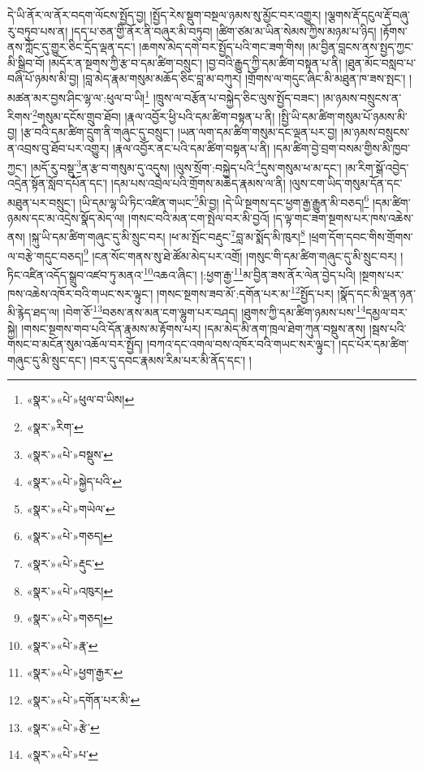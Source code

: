 དེ་ཡི་ནོར་ལ་ནོར་བདག་ལོངས་སྤྱོད་བྱ། །སྤྱོད་རེས་སྡུག་བསྔལ་ཉམས་སུ་མྱོང་བར་འགྱུར། །ལྕགས་རྡོ་དངུལ་རྡོ་བཞུ་རུ་བཏུབ་པས་ན། །དད་པ་ཅན་གྱི་ནོར་ནི་བཞུར་མི་བཏུབ། །ཚིག་ཙམ་མ་ཡིན་སེམས་ཀྱིས་མཉམ་པ་ཉིད། །རྟོགས་ནས་ཀློང་དུ་གྱུར་ཅིང་དྲོད་ལྡན་དང་། །ཆགས་མེད་དགེ་བར་སྤྱོད་པའི་གང་ཟག་གིས། །མ་བྱིན་བླངས་ནས་སྤྱད་ཀྱང་མི་སྒྲིབ་བོ། །མདོར་ན་སྔགས་ཀྱི་རྩ་བ་དམ་ཚིག་བསྲུང་། །བྱ་བའི་རྒྱུད་ཀྱི་དམ་ཚིག་བསྟན་པ་ནི། །ཐུན་མོང་བསླབ་པ་བཞི་པོ་ཉམས་མི་བྱ། །བླ་མེད་རྣམ་གསུམ་མཆོད་ཅིང་བླ་མ་བཀུར། །གྲོགས་ལ་གདུང་ཞིང་མི་མཐུན་ཁ་ཟས་སྤང་། །མཚན་མར་བྱས་ཤིང་ལྷ་ལ་:ཕུལ་བ་ཡི།\footnote{«སྣར་»«པེ་»ཕུལ་བ་ཡིས།} །ཁྲུས་ལ་བརྩོན་པ་བསྐྱེད་ཅིང་ལུས་སྤྱོད་བཟང་། །མ་ཉམས་བསྲུངས་ན་རིགས་\footnote{«སྣར་»རིག་}གསུམ་དངོས་གྲུབ་ཐོབ། །རྣལ་འབྱོར་ཕྱི་པའི་དམ་ཚིག་བསྟན་པ་ནི། །སྤྱི་ཡི་དམ་ཚིག་གསུམ་པོ་ཉམས་མི་བྱ། །རྩ་བའི་དམ་ཚིག་དྲུག་ནི་གཞུང་དུ་བསྲུང་། །ཡན་ལག་དམ་ཚིག་གསུམ་དང་ལྡན་པར་བྱ། །མ་ཉམས་བསྲུངས་ན་འབྲས་བུ་ཐོབ་པར་འགྱུར། །རྣལ་འབྱོར་ནང་པའི་དམ་ཚིག་བསྟན་པ་ནི། །དམ་ཚིག་བྱེ་བྲག་བསམ་གྱིས་མི་ཁྱབ་ཀྱང་། །མདོ་རུ་བསྡུ་\footnote{«སྣར་»«པེ་»བསྡུས་}ན་རྩ་བ་གསུམ་དུ་འདུས། །ལུས་སྲོག་:བསྐྱེད་པའི་\footnote{«སྣར་»«པེ་»སྐྱེད་པའི་}དུས་གསུམ་ཕ་མ་དང་། །མ་རིག་སྒོ་འབྱེད་འདྲེན་སྟོན་སློབ་དཔོན་དང་། །དམ་པས་འབྲེལ་པའི་གྲོགས་མཆེད་རྣམས་ལ་ནི། །ལུས་ངག་ཡིད་གསུམ་དོན་དང་མཐུན་པར་བསྲུང་། །ཡི་དམ་ལྷ་ཡི་ཏིང་འཛིན་གཡང་\footnote{«སྣར་»«པེ་»གཡེལ་}མི་བྱ། །དེ་ཡི་སྔགས་དང་ཕྱག་རྒྱ་རྒྱུན་མི་བཅད།\footnote{«སྣར་»«པེ་»གཅད།} །དམ་ཚིག་ཉམས་དང་མ་འདྲེས་སྣོད་མེད་ལ། །གསང་བའི་མན་ངག་སྤེལ་བར་མི་བྱའོ། །ད་ལྟ་གང་ཟག་སྔགས་པར་ཁས་འཆེས་ནས། །སྐུ་ཡི་དམ་ཚིག་གཞུང་དུ་མི་སྲུང་བར། །ཕ་མ་སྤོང་བརྡུང་\footnote{«སྣར་»«པེ་»རྡུང་}བླ་མ་སྨོད་མི་ཁུར།\footnote{«སྣར་»«པེ་»འཁུར།} །ཕྲག་དོག་དབང་གིས་གྲོགས་ལ་བརྩེ་གདུང་བཅད།\footnote{«སྣར་»«པེ་»གཅད།} །ངན་སོང་གནས་སུ་ཐེ་ཚོམ་མེད་པར་འགྲོ། །གསུང་གི་དམ་ཚིག་གཞུང་དུ་མི་སྲུང་བར། །ཏིང་འཛིན་འདོད་སྒྲུབ་འཛབ་ཏུ་མནའ་\footnote{«སྣར་»«པེ་»རྣ་}འཆའ་ཞིང་། །:ཕྱག་རྒྱ་\footnote{«སྣར་»«པེ་»ཕྱག་རྒྱར་}མ་བྱིན་ཟས་ནོར་ལེན་བྱེད་པའི། །སྔགས་པར་ཁས་འཆེས་འཁོར་བའི་གཡང་སར་ལྟུང་། །གསང་སྔགས་ཟབ་མོ་:དགོན་པར་མ་\footnote{«སྣར་»«པེ་»དགོན་པར་མི་}སྤྱོད་པར། །སྣོད་དང་མི་ལྡན་ཉན་མི་རྙེད་ཐད་ལ། །བེག་ཅོ་\footnote{«སྣར་»«པེ་»རྩེ་}བཅས་ནས་མན་ངག་ལྷུག་པར་བཤད། །ཐུགས་ཀྱི་དམ་ཚིག་ཉམས་པས་\footnote{«སྣར་»«པེ་»པ་}དམྱལ་བར་སྐྱེ། །གསང་སྔགས་གབ་པའི་དོན་རྣམས་མ་རྟོགས་པར། །དམ་མེད་མི་ནག་ཁྲལ་ཐེག་ཀུན་བསྡུས་ནས། །སྦས་པའི་གསང་བ་མངོན་སུམ་འཆོལ་བར་སྤྱོད། །བཀའ་དང་འགལ་བས་འཁོར་བའི་གཡང་སར་ལྟུང་། །དང་པོར་དམ་ཚིག་གཞུང་དུ་མི་སྲུང་དང་། །བར་དུ་དབང་རྣམས་རིམ་པར་མི་ནོད་དང་། །
